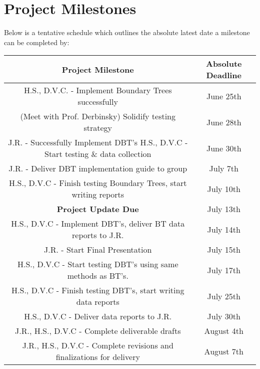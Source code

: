 \documentclass[10pt,letterpaper]{article}
\begin{document}
	\section{Project Milestones}
		Below is a tentative schedule which outlines the absolute latest date a milestone can be completed by:\\
		\begin{tabular}{|c|c|}
			\hline 
			\rule[2ex]{0pt}{2.5ex} \textbf{Project Milestone} & \textbf{Absolute Deadline} \\ 
			\hline 
			\rule[0ex]{0pt}{2.5ex} H.S., D.V.C. - Implement Boundary Trees successfully & June 25th \\ 
			\hline 
			\rule[0ex]{0pt}{2.5ex} (Meet with Prof. Derbinsky) Solidify testing strategy & June 28th  \\ 
			\hline 
			\rule[0ex]{0pt}{2.5ex} J.R. - Successfully Implement DBT's  H.S., D.V.C - Start testing \& data collection  & June 30th \\ 
			\hline 
			\rule[0ex]{0pt}{2.5ex} J.R. - Deliver DBT implementation guide to group & July 7th \\ 
			\hline 
			\rule[0ex]{0pt}{2.5ex} H.S., D.V.C - Finish testing Boundary Trees, start writing reports & July 10th \\ 
			\hline 
			\rule[0ex]{0pt}{2.5ex} \textbf{Project Update Due} & July 13th \\ 
			\hline 
			\rule[0ex]{0pt}{2.5ex} H.S., D.V.C - Implement DBT's, deliver BT data reports to J.R. & July 14th \\ 
			\hline 
			\rule[0ex]{0pt}{2.5ex} J.R. - Start Final Presentation & July 15th \\ 
			\hline 
			\rule[0ex]{0pt}{2.5ex} H.S., D.V.C - Start testing DBT's using same methods as BT's. & July 17th \\ 
			\hline 
			\rule[0ex]{0pt}{2.5ex} H.S., D.V.C - Finish testing DBT's, start writing data reports & July 25th \\ 
			\hline 
			\rule[0ex]{0pt}{2.5ex} H.S., D.V.C - Deliver data reports to J.R. & July 30th \\ 
			\hline 
			\rule[0ex]{0pt}{2.5ex} J.R., H.S., D.V.C - Complete deliverable drafts & August 4th \\ 
			\hline 
			\rule[0ex]{0pt}{2.5ex} J.R., H.S., D.V.C - Complete revisions and finalizations for delivery & August 7th \\ 
			\hline 
		\end{tabular} 
	
	\vspace{0.5cm}
\end{document}
